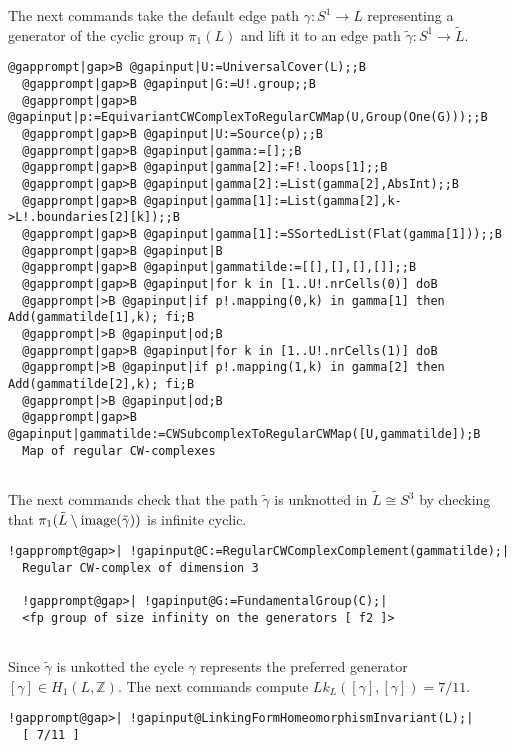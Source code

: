 \documentclass[a4paper,11pt]{report}
\begin{document}
{{ The next commands take the default edge path $\gamma\colon S^1\rightarrow L$ representing a generator of the cyclic group $\pi_1(L)$ and lift it to an edge path $\tilde\gamma\colon S^1\rightarrow \tilde L$. 
\begin{Verbatim}[commandchars=@|B,fontsize=\small,frame=single,label=Example]
  @gapprompt|gap>B @gapinput|U:=UniversalCover(L);;B
  @gapprompt|gap>B @gapinput|G:=U!.group;;B
  @gapprompt|gap>B @gapinput|p:=EquivariantCWComplexToRegularCWMap(U,Group(One(G)));;B
  @gapprompt|gap>B @gapinput|U:=Source(p);;B
  @gapprompt|gap>B @gapinput|gamma:=[];;B
  @gapprompt|gap>B @gapinput|gamma[2]:=F!.loops[1];;B
  @gapprompt|gap>B @gapinput|gamma[2]:=List(gamma[2],AbsInt);;B
  @gapprompt|gap>B @gapinput|gamma[1]:=List(gamma[2],k->L!.boundaries[2][k]);;B
  @gapprompt|gap>B @gapinput|gamma[1]:=SSortedList(Flat(gamma[1]));;B
  @gapprompt|gap>B @gapinput|B
  @gapprompt|gap>B @gapinput|gammatilde:=[[],[],[],[]];;B
  @gapprompt|gap>B @gapinput|for k in [1..U!.nrCells(0)] doB
  @gapprompt|>B @gapinput|if p!.mapping(0,k) in gamma[1] then Add(gammatilde[1],k); fi;B
  @gapprompt|>B @gapinput|od;B
  @gapprompt|gap>B @gapinput|for k in [1..U!.nrCells(1)] doB
  @gapprompt|>B @gapinput|if p!.mapping(1,k) in gamma[2] then Add(gammatilde[2],k); fi;B
  @gapprompt|>B @gapinput|od;B
  @gapprompt|gap>B @gapinput|gammatilde:=CWSubcomplexToRegularCWMap([U,gammatilde]);B
  Map of regular CW-complexes
  
\end{Verbatim}
 

The next commands check that the path $\tilde\gamma$ is unknotted in $\tilde L\cong S^3$ by checking that $\pi_1(\tilde L\setminus {\rm image}(\tilde\gamma))$ is infinite cyclic. 
\begin{Verbatim}[commandchars=!@|,fontsize=\small,frame=single,label=Example]
  !gapprompt@gap>| !gapinput@C:=RegularCWComplexComplement(gammatilde);|
  Regular CW-complex of dimension 3
  
  !gapprompt@gap>| !gapinput@G:=FundamentalGroup(C);|
  <fp group of size infinity on the generators [ f2 ]>
  
\end{Verbatim}
 

Since $\tilde\gamma$ is unkotted the cycle $\gamma$ represents the preferred generator $[\gamma]\in H_1(L,\mathbb Z)$. The next commands compute $Lk_L([\gamma],[\gamma])= 7/11 $. 
\begin{Verbatim}[commandchars=!@|,fontsize=\small,frame=single,label=Example]
  !gapprompt@gap>| !gapinput@LinkingFormHomeomorphismInvariant(L);|
  [ 7/11 ]
  

\end{Verbatim}}}
\end{document}
